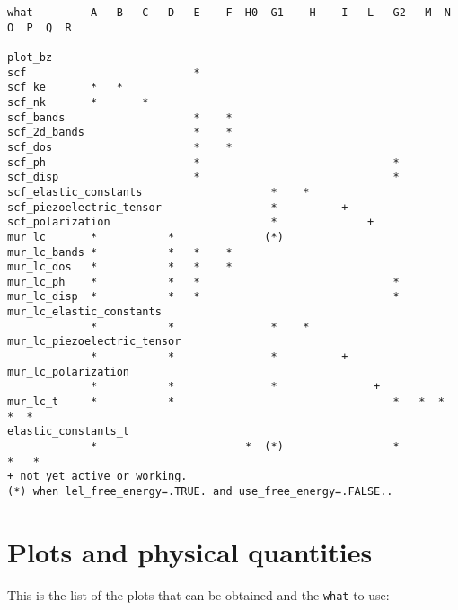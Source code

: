 \documentclass[12pt,a4paper]{article}
\begin{document}
\begin{verbatim}
what         A   B   C   D   E    F  H0  G1    H    I   L   G2   M  N  O  P  Q  R

plot_bz
scf                          *
scf_ke       *   *
scf_nk       *       *
scf_bands                    *    *
scf_2d_bands                 *    *
scf_dos                      *    *
scf_ph                       *                              *
scf_disp                     *                              *
scf_elastic_constants                    *    *
scf_piezoelectric_tensor                 *          +
scf_polarization                         *              +
mur_lc       *           *              (*)
mur_lc_bands *           *   *    *
mur_lc_dos   *           *   *    *
mur_lc_ph    *           *   *                              *
mur_lc_disp  *           *   *                              *
mur_lc_elastic_constants
             *           *               *    *
mur_lc_piezoelectric_tensor
             *           *               *          +
mur_lc_polarization
             *           *               *               +
mur_lc_t     *           *                                  *   *  *  *  *
elastic_constants_t
             *                       *  (*)                 *               *   *
+ not yet active or working.
(*) when lel_free_energy=.TRUE. and use_free_energy=.FALSE.. 
\end{verbatim}

\newpage
\section{\color{coral}Plots and physical quantities}
This is the list of the plots that can be obtained and 
the \texttt{what} to use:
\end{document}
